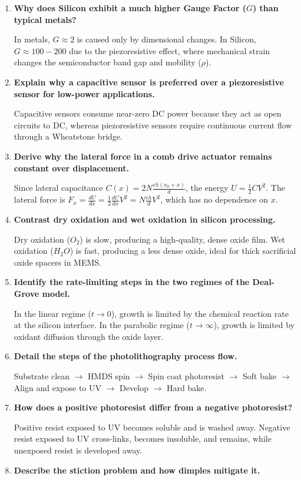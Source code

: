 \documentclass[12pt,a4paper]{article}
\newcommand{\Q}[1]{\textbf{#1}\par\noindent\ignorespaces}
\begin{document}
\begin{tcolorbox}[exambox, title={\textbf{Frequently Asked / Viva Questions}}]
\begin{enumerate}[topsep=0pt, label=\textbf{Q\arabic*.}, itemsep=5pt]
  \item \Q{Why does Silicon exhibit a much higher Gauge Factor ($G$) than typical metals?}
    In metals, $G \approx 2$ is caused only by dimensional changes. In Silicon, $G \approx 100-200$ due to the piezoresistive effect, where mechanical strain changes the semiconductor band gap and mobility ($\rho$).
  \item \Q{Explain why a capacitive sensor is preferred over a piezoresistive sensor for low-power applications.}
    Capacitive sensors consume near-zero DC power because they act as open circuits to DC, whereas piezoresistive sensors require continuous current flow through a Wheatstone bridge.
  \item \Q{Derive why the lateral force in a comb drive actuator remains constant over displacement.}
    Since lateral capacitance $C(x) = 2N \frac{\epsilon h(x_0 + x)}{d}$, the energy $U = \frac{1}{2} C V^2$. The lateral force is $F_x = \frac{dU}{dx} = \frac{1}{2} \frac{dC}{dx} V^2 = N \frac{\epsilon h}{d} V^2$, which has no dependence on $x$.
  \item \Q{Contrast dry oxidation and wet oxidation in silicon processing.}
    Dry oxidation ($O_2$) is slow, producing a high-quality, dense oxide film. Wet oxidation ($H_2O$) is fast, producing a less dense oxide, ideal for thick sacrificial oxide spacers in MEMS.
  \item \Q{Identify the rate-limiting steps in the two regimes of the Deal-Grove model.}
    In the linear regime ($t \to 0$), growth is limited by the chemical reaction rate at the silicon interface. In the parabolic regime ($t \to \infty$), growth is limited by oxidant diffusion through the oxide layer.
  \item \Q{Detail the steps of the photolithography process flow.}
    Substrate clean $\to$ HMDS spin $\to$ Spin coat photoresist $\to$ Soft bake $\to$ Align and expose to UV $\to$ Develop $\to$ Hard bake.
  \item \Q{How does a positive photoresist differ from a negative photoresist?}
    Positive resist exposed to UV becomes soluble and is washed away. Negative resist exposed to UV cross-links, becomes insoluble, and remains, while unexposed resist is developed away.
  \item \Q{Describe the stiction problem and how dimples mitigate it.}

\end{enumerate}
\end{tcolorbox}
\end{document}
